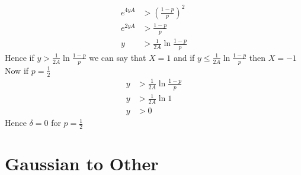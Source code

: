 \documentclass[journal,12pt,twocolumn]{IEEEtran}
\renewcommand\thesection{\arabic{section}}
\begin{document}
\begin{enumerate}[label=\thesection.\arabic*
,ref=\thesection.\theenumi]
\begin{align}
    e^{4yA} &> (\frac{1-p}{p})^2 \\
    e^{2yA} &> \frac{1-p}{p} \\
    y &> \frac{1}{2A}\ln{\frac{1-p}{p}}
\end{align}
Hence if $y > \frac{1}{2A}\ln{\frac{1-p}{p}}$ we can say that $X = 1$ and if $y \leq \frac{1}{2A}\ln{\frac{1-p}{p}}$ then $X = -1$
Now if $p = \frac{1}{2}$
\begin{align}
    y &> \frac{1}{2A}\ln{\frac{1-p}{p}} \\
    y  &> \frac{1}{2A}\ln{1} \\
    y  &> 0
\end{align}
Hence $\delta = 0$ for $p = \frac{1}{2}$
		\end{enumerate}
\section{Gaussian to Other}
\end{document}
